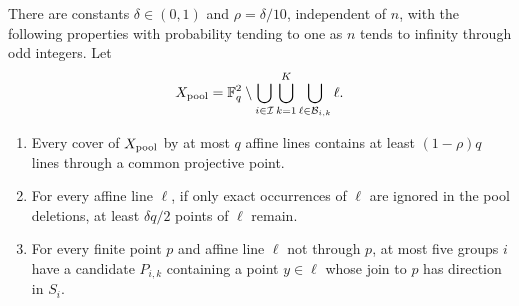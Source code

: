 \begin{lemma}
\label{con-pool-properties}
There are constants \(\delta\in(0,1)\) and
\(\rho=\delta/10\), independent of \(n\), with the following
properties with probability tending to one as \(n\) tends to
infinity through odd integers. Let
\[
 X_{\rm pool}
 =\mathbb F_q^2\setminus
   \bigcup_{i\in\mathcal I}\bigcup_{k=1}^K
          \bigcup_{\ell\in\mathcal B_{i,k}}\ell.
\]
\begin{enumerate}
\item Every cover of \(X_{\rm pool}\) by at most \(q\) affine
lines contains at least \((1-\rho)q\) lines through a common
projective point.
\item For every affine line \(\ell\), if only exact occurrences
of \(\ell\) are ignored in the pool deletions, at least
\(\delta q/2\) points of \(\ell\) remain.
\item For every finite point \(p\) and affine line \(\ell\)
not through \(p\), at most five groups \(i\) have a candidate
\(P_{i,k}\) containing a point \(y\in\ell\) whose join to
\(p\) has direction in \(S_i\).
\end{enumerate}
\end{lemma}

